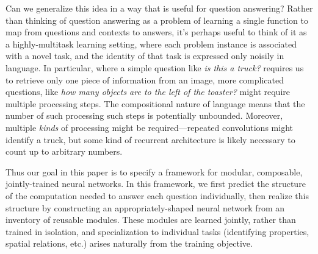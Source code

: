 Can we generalize this idea in a way that is useful for question answering?
Rather than thinking of question answering as a problem of learning a single
function to map from questions and contexts to answers, it's perhaps useful to
think of it as a highly-multitask learning setting, where each problem instance
is associated with a novel task, and the identity of that task is expressed only
noisily in language. In particular, where a simple question like \emph{is this a
truck?} requires us to retrieve only one piece of information from an image,
more complicated questions, like \emph{how many objects are to the left of
the toaster?} might require multiple processing steps. The compositional nature
of language means that the number of such processing such steps is
potentially unbounded. Moreover, multiple \emph{kinds} of processing might be
required---repeated convolutions might identify a truck, but some kind of
recurrent architecture is likely necessary to count up to arbitrary numbers.

Thus our goal in this paper is to specify a framework for modular, composable,
jointly-trained neural networks. In this framework, we first predict the
structure of the computation needed to answer each question individually, then
realize this structure by constructing an appropriately-shaped neural network
from an inventory of reusable modules. These modules are learned jointly, rather
than trained in isolation, and specialization to individual tasks (identifying
properties, spatial relations, etc.) arises naturally from the training
objective.

